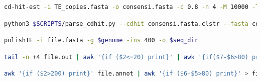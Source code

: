 \documentclass[10pt]{article}
\begin{document}
\begin{lstlisting}[language=bash, frame=trb, caption=Commande \texttt{cd-hit-est}.,label=cdhit]
cd-hit-est -i TE_copies.fasta -o consensi.fasta -c 0.8 -n 4 -M 10000 -T 54 -d 0
\end{lstlisting}

\vspace{0.5cm}

\begin{lstlisting}[language=bash, frame=trb, caption=Commande \texttt{Refiner}., label=refiner]
python3 $SCRIPTS/parse_cdhit.py --cdhit consensi.fasta.clstr --fasta copies.fasta -o resultats/ -t 16
\end{lstlisting}

\vspace{0.5cm}

\begin{lstlisting}[language=bash, frame=trb, caption=Commande pour le pipeline de polissage., label=polishte_code]
polishTE -i file.fasta -g $genome -ins 400 -o $seq_dir
\end{lstlisting}

\vspace{0.5cm}

\begin{lstlisting}[language=bash, frame=trb, caption=Filtrage de l'output de RepeatMasker., label=rmout_filter]
tail -n +4 file.out | awk '{if ($2<=20) print}' | awk '{if($7-$6>80) print}' > file.out.filtered 
\end{lstlisting}

\vspace{0.5cm}

\begin{lstlisting}[language=bash, frame=trb, caption=Filtrage de l'output de RepeatProteinMask., label=rmprot_filter]
awk '{if ($2>200) print}' file.annot | awk '{if ($6-$5>80) print}' > file.annot.filtered
\end{lstlisting}

\newpage


\end{document}
